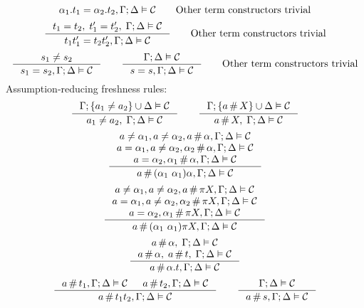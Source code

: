 \documentclass[english, mgr]{iithesis}
\begin{document}
\begin{appendices}
$${}{
   \alpha_1. t_1 = \alpha_2. t_2 , \Gamma ; \Delta \vDash \mathcal{C}
}
\qquad
\text{Other term constructors trivial}
$$
$$
\inference{
  \term_1 \ceq \term_2 , \; \term_1' \ceq \term_2', \;\cEnv ; \icEnv \vDash \sconstr
}{
   \term_1 \term_1' \ceq \term_2 \term_2' , \cEnv ; \icEnv \vDash \sconstr
}
\qquad
\text{Other term constructors trivial}
$$
$$
\inference{
  \symb_1 \cneq \symb_2
}{
  \symb_1 \ceq \symb_2 , \cEnv ; \icEnv \vDash \sconstr
}
\qquad
\inference{
  \cEnv ; \icEnv \vDash \sconstr
}{
  \symb\ceq \symb , \cEnv ; \icEnv \vDash \sconstr
}
\qquad
\text{Other term constructors trivial}
$$
Assumption-reducing freshness rules:
$$
\inference{
  \cEnv ; \{\atomv_1 \cneq \atomv_2\} \cup \icEnv \vDash \sconstr
}{
  \atomv_1 \cneq \atomv_2, \; \cEnv ; \icEnv \vDash \sconstr
}
\qquad
\inference{
  \cEnv ; \{\atomv \cfresh \termv\} \cup \icEnv \vDash \sconstr
}{
  \atomv \cfresh \termv, \; \cEnv ; \icEnv \vDash \sconstr
}
$$
$$
\inference{
  \atomv \cneq \atomexp_1, \atomv \cneq \atomexp_2, \atomv     \cfresh \atomexp, \cEnv ; \icEnv \vDash \sconstr \\
  \atomv \ceq  \atomexp_1, \atomv \cneq \atomexp_2, \atomexp_2 \cfresh \atomexp, \cEnv ; \icEnv \vDash \sconstr \\
                           \atomv \ceq  \atomexp_2, \atomexp_1 \cfresh \atomexp, \cEnv ; \icEnv \vDash \sconstr
}{
  \atomv \cfresh \permswap{\atomexp_1}{\atomexp_1} \atomexp, \cEnv ; \icEnv \vDash \sconstr
}
$$
$$
\inference{
  \atomv \cneq \atomexp_1, \atomv \cneq \atomexp_2, \atomv     \cfresh \perm\termv, \cEnv ; \icEnv \vDash \sconstr \\
  \atomv \ceq  \atomexp_1, \atomv \cneq \atomexp_2, \atomexp_2 \cfresh \perm\termv, \cEnv ; \icEnv \vDash \sconstr \\
                           \atomv \ceq  \atomexp_2, \atomexp_1 \cfresh \perm\termv, \cEnv ; \icEnv \vDash \sconstr
}{
  \atomv \cfresh \permswap{\atomexp_1}{\atomexp_1} \perm\termv, \cEnv ; \icEnv \vDash \sconstr
}
$$
$$
\inference{
  \atomv \cfresh \atomexp, \; \cEnv ; \icEnv \vDash \sconstr \\
  \atomv \cfresh \atomexp, \; \atomv \cfresh \term,\;\cEnv ; \icEnv \vDash \sconstr
}{
  \atomv \cfresh \tbind{\atomexp} \term , \cEnv ; \icEnv \vDash \sconstr
}
$$
$$
\inference{
  \atomv \cfresh \term_1 , \cEnv ; \icEnv \vDash \sconstr &
  \atomv \cfresh \term_2 , \cEnv ; \icEnv \vDash \sconstr
}{
  \atomv \cfresh \term_1 \term_2 , \cEnv ; \icEnv \vDash \sconstr
}
\qquad
\inference{
  \cEnv ; \icEnv \vDash \sconstr
}{
  \atomv \cfresh \symb, \cEnv ; \icEnv \vDash \sconstr
}$$
\end{appendices}
\end{document}
